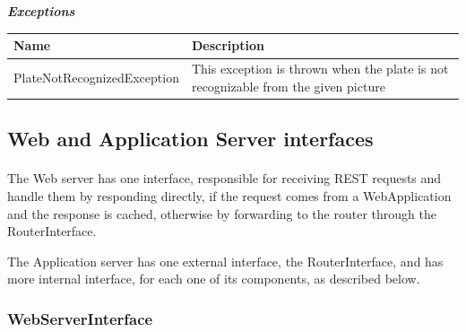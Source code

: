 							\subparagraph{}
								\textit{\textbf{Exceptions}}
									\begin{table}[!h]
									\begin{tabular}{L{0.3\textwidth}L{0.3\textwidth}}
										\toprule
										Name & Description \\
										\midrule
								  		PlateNotRecognizedException & This exception is thrown when the plate is not recognizable from the given picture \\
								 		\bottomrule
									\end{tabular}
								\end{table}
								
			\subsection{Web and Application Server interfaces}
				\paragraph{}
					The Web server has one interface, responsible for receiving REST requests and handle them by responding directly, if the request comes from a WebApplication and the response is cached, otherwise by forwarding to the router through the RouterInterface. 
					
					The Application server has one external interface, the RouterInterface, and has more internal interface, for each one of its components, as described below.
				\subsubsection{WebServerInterface}
